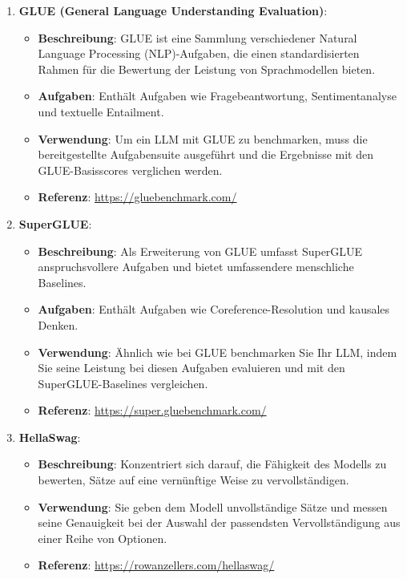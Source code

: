  \begin{enumerate} 
    \item \textbf{GLUE (General Language Understanding Evaluation)}\cite{huang_evaluating_2024}: 
    \begin{itemize} 
        \item \textbf{Beschreibung}: GLUE ist eine Sammlung verschiedener Natural Language Processing (NLP)-Aufgaben, die einen standardisierten Rahmen für die Bewertung der Leistung von Sprachmodellen bieten. 
        \item \textbf{Aufgaben}: Enthält Aufgaben wie Fragebeantwortung, Sentimentanalyse und textuelle Entailment. 
        \item \textbf{Verwendung}: Um ein LLM mit GLUE zu benchmarken, muss die bereitgestellte Aufgabensuite ausgeführt und die Ergebnisse mit den GLUE-Basisscores verglichen werden. 
        \item \textbf{Referenz}: \url{https://gluebenchmark.com/} 
    \end{itemize}

    \item \textbf{SuperGLUE}\cite{huang_evaluating_2024}:
    \begin{itemize}
        \item \textbf{Beschreibung}: Als Erweiterung von GLUE umfasst SuperGLUE anspruchsvollere Aufgaben und bietet umfassendere menschliche Baselines.
        \item \textbf{Aufgaben}: Enthält Aufgaben wie Coreference-Resolution und kausales Denken.
        \item \textbf{Verwendung}: Ähnlich wie bei GLUE benchmarken Sie Ihr LLM, indem Sie seine Leistung bei diesen Aufgaben evaluieren und mit den SuperGLUE-Baselines vergleichen.
        \item \textbf{Referenz}: \url{https://super.gluebenchmark.com/}
    \end{itemize}
    
    \item \textbf{HellaSwag}\cite{huang_evaluating_2024}:
    \begin{itemize}
        \item \textbf{Beschreibung}: Konzentriert sich darauf, die Fähigkeit des Modells zu bewerten, Sätze auf eine vernünftige Weise zu vervollständigen.
        \item \textbf{Verwendung}: Sie geben dem Modell unvollständige Sätze und messen seine Genauigkeit bei der Auswahl der passendsten Vervollständigung aus einer Reihe von Optionen.
        \item \textbf{Referenz}: \url{https://rowanzellers.com/hellaswag/}
    \end{itemize}
    

\end{enumerate}
